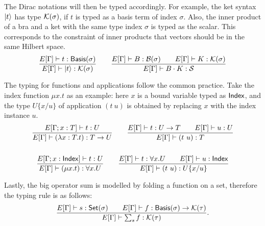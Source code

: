 \documentclass[runningheads]{llncs}
\begin{document}
The Dirac notations will then be typed accordingly. For example, the ket syntax $\ket{t}$ has type $\mathcal{K}(\sigma)$, if $t$ is typed as a basis term of index $\sigma$. Also, the inner product of a bra and a ket with the same type index $\sigma$ is typed as the scalar. This corresponds to the constraint of inner products that vectors should be in the same Hilbert space.
\begin{gather*}
    \frac{E[\Gamma]\vdash t : \mathsf{Basis}(\sigma)}{E[\Gamma] \vdash \ket{t} : \mathcal{K}(\sigma)}
    \qquad
    \frac{E[\Gamma]\vdash B : \mathcal{B}(\sigma) \qquad E[\Gamma]\vdash K : \mathcal{K}(\sigma)}{E[\Gamma] \vdash B \cdot K : \mathcal{S}}
\end{gather*}

The typing for functions and applications follow the common practice. 
Take the index function $\mu x. t$ as an example: here $x$ is a bound variable typed as $\mathsf{Index}$, and the type $U\{x/u\}$ of application $(t\ u)$ is obtained by replacing $x$ with the index instance $u$.
\begin{gather*}
    \frac{E[\Gamma; x : T] \vdash t : U}{E[\Gamma] \vdash (\lambda x : T . t) : T \to U}
    \qquad
    \frac{E[\Gamma] \vdash t:U \to T \qquad E[\Gamma] \vdash u:U}{E[\Gamma] \vdash (t\ u):T} \\
    \\
    \frac{E[\Gamma; x : \mathsf{Index}] \vdash t : U}{E[\Gamma] \vdash (\mu x.t) : \forall x.U}
    \qquad
    \frac{E[\Gamma] \vdash t:\forall x.U \qquad E[\Gamma] \vdash u : \mathsf{Index}}{E[\Gamma] \vdash (t\ u):U\{x/u\}}
\end{gather*}


Lastly, the big operator sum is modelled by folding a function on a set, therefore the typing rule is as follows:
\[
    \frac{E[\Gamma] \vdash s : \mathsf{Set}(\sigma) \qquad E[\Gamma] \vdash f : \mathsf{Basis}(\sigma) \to \mathcal{K}(\tau)}{E[\Gamma] \vdash \sum_{s} f : \mathcal{K}(\tau)}.
\]

\end{document}
